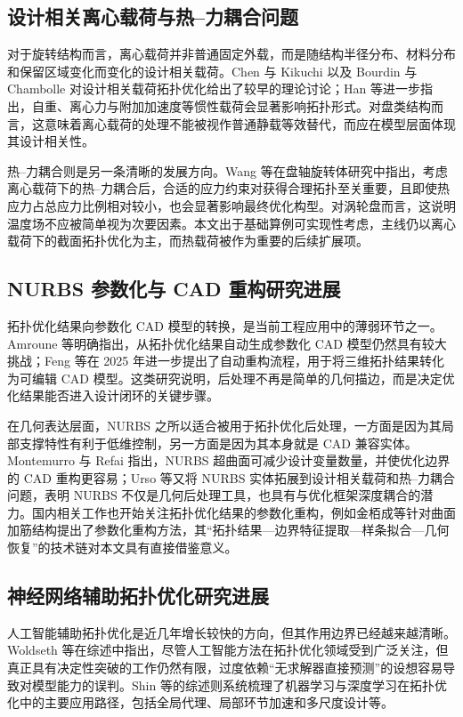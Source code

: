 \documentclass{FRB-style}
\begin{document}
\subsection{设计相关离心载荷与热--力耦合问题}

对于旋转结构而言，离心载荷并非普通固定外载，而是随结构半径分布、材料分布和保留区域变化而变化的设计相关载荷。Chen 与 Kikuchi 以及 Bourdin 与 Chambolle 对设计相关载荷拓扑优化给出了较早的理论讨论；Han 等进一步指出，自重、离心力与附加加速度等惯性载荷会显著影响拓扑形式\cite{Chen2001,Bourdin2003,Han2021}。对盘类结构而言，这意味着离心载荷的处理不能被视作普通静载等效替代，而应在模型层面体现其设计相关性。

热--力耦合则是另一条清晰的发展方向。Wang 等在盘轴旋转体研究中指出，考虑离心载荷下的热--力耦合后，合适的应力约束对获得合理拓扑至关重要，且即使热应力占总应力比例相对较小，也会显著影响最终优化构型\cite{Wang2025}。对涡轮盘而言，这说明温度场不应被简单视为次要因素。本文出于基础算例可实现性考虑，主线仍以离心载荷下的截面拓扑优化为主，而热载荷被作为重要的后续扩展项。

\subsection{NURBS 参数化与 CAD 重构研究进展}

拓扑优化结果向参数化 CAD 模型的转换，是当前工程应用中的薄弱环节之一。Amroune 等明确指出，从拓扑优化结果自动生成参数化 CAD 模型仍然具有较大挑战；Feng 等在 2025 年进一步提出了自动重构流程，用于将三维拓扑结果转化为可编辑 CAD 模型\cite{Amroune2022,Feng2025,Ren2025}。这类研究说明，后处理不再是简单的几何描边，而是决定优化结果能否进入设计闭环的关键步骤。

在几何表达层面，NURBS 之所以适合被用于拓扑优化后处理，一方面是因为其局部支撑特性有利于低维控制，另一方面是因为其本身就是 CAD 兼容实体。Montemurro 与 Refai 指出，NURBS 超曲面可减少设计变量数量，并使优化边界的 CAD 重构更容易；Urso 等又将 NURBS 实体拓展到设计相关载荷和热--力耦合问题，表明 NURBS 不仅是几何后处理工具，也具有与优化框架深度耦合的潜力\cite{Montemurro2021,Urso2024DDL,Urso2024TM}。国内相关工作也开始关注拓扑优化结果的参数化重构，例如金栢成等针对曲面加筋结构提出了参数化重构方法，其“拓扑结果—边界特征提取—样条拟合—几何恢复”的技术链对本文具有直接借鉴意义\cite{Jin2024}。

\subsection{神经网络辅助拓扑优化研究进展}

人工智能辅助拓扑优化是近几年增长较快的方向，但其作用边界已经越来越清晰。Woldseth 等在综述中指出，尽管人工智能方法在拓扑优化领域受到广泛关注，但真正具有决定性突破的工作仍然有限，过度依赖“无求解器直接预测”的设想容易导致对模型能力的误判\cite{Woldseth2022}。Shin 等的综述则系统梳理了机器学习与深度学习在拓扑优化中的主要应用路径，包括全局代理、局部环节加速和多尺度设计等\cite{Shin2023}。
\end{document}

